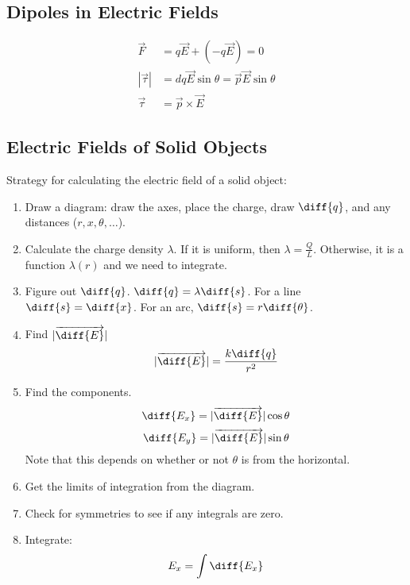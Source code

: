 \documentclass{math}
\begin{document}
\subsection*{Dipoles in Electric Fields}
\begin{center}
\end{center}
\begin{align*}
  \vec{F} &= q\vec{E}+(-q\vec{E}) = 0 \\
  |\vec{\tau}| &= dq\vec{E}\sin\theta = \vec{p}\vec{E}\sin\theta \\
  \vec{\tau} &= \vec{p}\times\vec{E}
\end{align*}

\subsection*{Electric Fields of Solid Objects}
Strategy for calculating the electric field of a solid object:
\begin{enumerate}
  \item Draw a diagram: draw the axes, place the charge, draw \( \diff{q} \),
  and any distances (\( r,x,\theta,\dots \)).
  \item Calculate the charge density \( \lambda \). If it is uniform, then
  \( \lambda = \frac{Q}{L} \). Otherwise, it is a function \( \lambda(r) \) and
  we need to integrate.
  \item Figure out \( \diff{q} \). \( \diff{q} = \lambda\diff{s} \). For a line
  \( \diff{s} = \diff{x} \). For an arc, \( \diff{s} = r\diff{\theta} \).
  \item Find \( |\overrightarrow{\diff{E}}| \)
  \[ |\overrightarrow{\diff{E}}| = \frac{k\diff{q}}{r^2} \]
  \item Find the components.
  \[ \diff{E_x} = |\overrightarrow{\diff{E}}|\cos\theta \]
  \[ \diff{E_y} = |\overrightarrow{\diff{E}}|\sin\theta \]
  Note that this depends on whether or not \( \theta \) is from the horizontal.
  \item Get the limits of integration from the diagram.
  \item Check for symmetries to see if any integrals are zero.
  \item Integrate:
  \[ E_x = \int\diff{E_x} \]
\end{enumerate}
\end{document}
